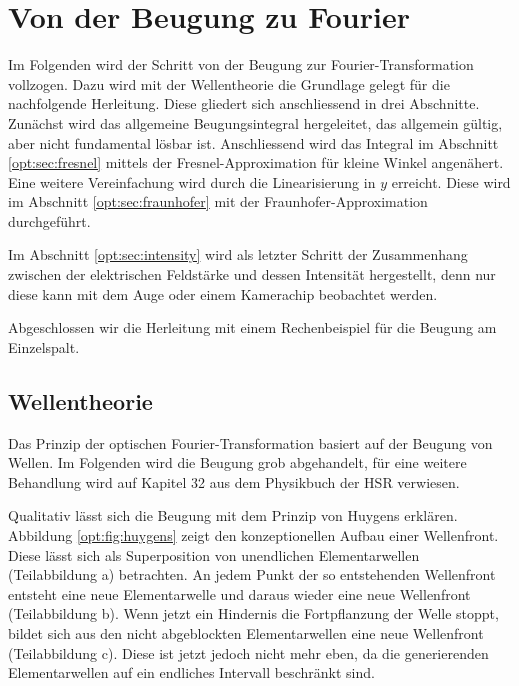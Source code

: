 %
%
%
%
\section{Von der Beugung zu Fourier\label{opt:section:grundlagen}}

Im Folgenden wird der Schritt von der Beugung zur Fourier-Transformation vollzogen.
Dazu wird mit der Wellentheorie die Grundlage gelegt für die nachfolgende Herleitung.
Diese gliedert sich anschliessend in drei Abschnitte. 
Zunächst wird das allgemeine Beugungsintegral hergeleitet, das allgemein gültig, aber nicht fundamental lösbar ist.
Anschliessend wird das Integral im Abschnitt \ref{opt:sec:fresnel} mittels der Fresnel-Approximation für kleine Winkel angenähert.
Eine weitere Vereinfachung wird durch die Linearisierung in $y$ erreicht. 
Diese wird im Abschnitt \ref{opt:sec:fraunhofer} mit der Fraunhofer-Approximation durchgeführt.

Im Abschnitt \ref{opt:sec:intensity} wird als letzter Schritt der Zusammenhang zwischen der elektrischen Feldstärke und dessen Intensität hergestellt, denn nur diese kann mit dem Auge oder einem Kamerachip beobachtet werden.

Abgeschlossen wir die Herleitung mit einem Rechenbeispiel für die Beugung am Einzelspalt. 


\subsection{Wellentheorie}
\label{opt:subsection:huygens}
Das Prinzip der optischen Fourier-Transformation basiert auf der Beugung von Wellen.
Im Folgenden wird die Beugung grob abgehandelt, für eine weitere Behandlung wird auf Kapitel 32 aus dem Physikbuch der HSR \cite{opt:HSR:Physik2} verwiesen.

Qualitativ lässt sich die Beugung mit dem Prinzip von Huygens erklären. 
Abbildung \ref{opt:fig:huygens} zeigt den konzeptionellen Aufbau einer Wellenfront.
Diese lässt sich als Superposition von unendlichen Elementarwellen (Teilabbildung a) betrachten.
An jedem Punkt der so entstehenden Wellenfront entsteht eine neue Elementarwelle und daraus wieder eine neue Wellenfront (Teilabbildung b).
Wenn jetzt ein Hindernis die Fortpflanzung der Welle stoppt, bildet sich aus den nicht abgeblockten Elementarwellen eine neue Wellenfront (Teilabbildung c).
Diese ist jetzt jedoch nicht mehr eben, da die generierenden Elementarwellen auf ein endliches Intervall beschränkt sind.

